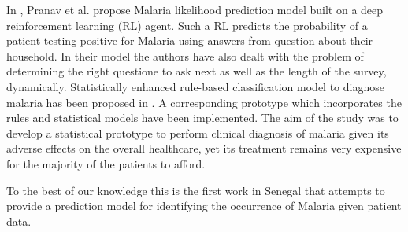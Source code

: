 In \cite{Pr17}, Pranav et al. propose Malaria likelihood prediction model built on a deep reinforcement learning (RL) agent. 
Such a RL predicts the probability of a patient testing positive for Malaria using answers from question about their household. In 
their model the authors have also dealt with the problem of determining the right questione to ask next as well as the length of the survey, dynamically.
Statistically enhanced rule-based classification model to diagnose malaria has been proposed in \cite{Bb16}. A corresponding prototype 
which incorporates the rules and statistical models have been implemented. The aim of the study was to develop a statistical 
prototype to perform clinical diagnosis of malaria given its adverse effects on the overall healthcare, yet its treatment remains 
very expensive for the majority of the patients to afford.

To the best of our knowledge this is the first work in Senegal that attempts to provide a prediction model for identifying 
the occurrence of Malaria given patient data.  
